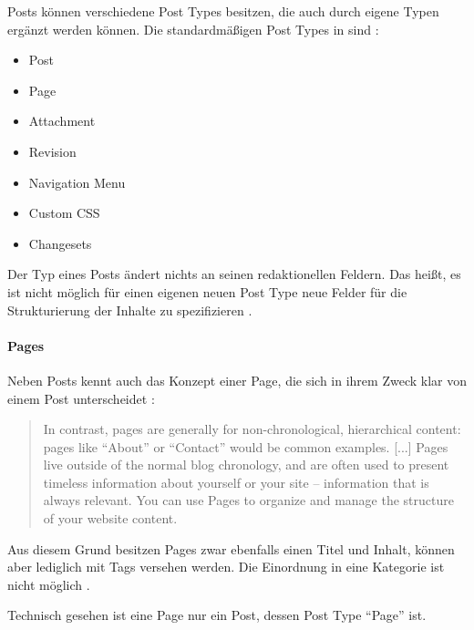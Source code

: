         Posts können verschiedene Post Types besitzen,
        die auch durch eigene Typen ergänzt werden können.
        Die standardmäßigen Post Types in {\wordpress} sind
        \cite{wordpress:PostTypes}:

        \begin{itemize}
            \item Post
            \item Page
            \item Attachment
            \item Revision
            \item Navigation Menu
            \item Custom CSS
            \item Changesets
        \end{itemize}

        Der Typ eines Posts ändert nichts an seinen redaktionellen Feldern.
        Das heißt, es ist nicht möglich für einen eigenen neuen Post Type
        neue Felder für die Strukturierung der Inhalte zu spezifizieren
        \cite{wordpress:Posts, wordpress:PostTypes}.

        \paragraph*{Pages}
        Neben Posts kennt {\wordpress} auch das Konzept einer Page,
        die sich in ihrem Zweck klar von einem Post unterscheidet
        \cite{wordpress:Pages}:

        \begin{quote}
            In contrast, pages are generally for non-chronological,
            hierarchical content: pages like "`About"' or "`Contact"'
            would be common examples.
            [...]
            Pages live outside of the normal blog chronology,
            and are often used to present timeless information about
            yourself or your site -- information that is always relevant.
            You can use Pages to organize and manage the structure of your website content.
        \end{quote}

        Aus diesem Grund besitzen Pages zwar ebenfalls einen Titel und Inhalt,
        können aber lediglich mit Tags versehen werden.
        Die Einordnung in eine Kategorie ist nicht möglich
        \cite{wordpress:Pages}.

        Technisch gesehen ist eine Page nur ein Post,
        dessen Post Type "`Page"' ist.

